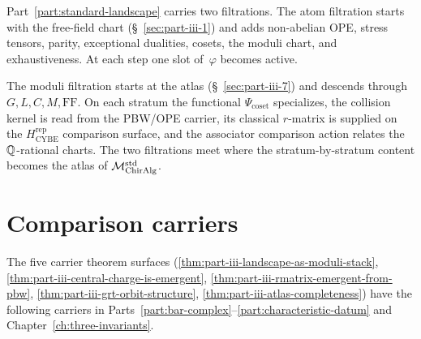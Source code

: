 Part~\ref{part:standard-landscape} carries two filtrations.
The atom filtration starts with the free-field chart
(\S~\ref{sec:part-iii-1}) and adds non-abelian OPE, stress tensors,
parity, exceptional dualities, cosets, the moduli chart, and
exhaustiveness. At each step one slot of~$\varphi$ becomes active.

The moduli filtration starts at the atlas
(\S~\ref{sec:part-iii-7}) and descends through
$G,L,C,M,\mathrm{FF}$. On each stratum the functional
$\Psi_{\mathrm{coset}}$ specializes, the collision kernel is read from
the PBW/OPE carrier, its classical $r$-matrix is supplied on the
$H_{\mathrm{CYBE}}^{\mathrm{rep}}$ comparison surface, and the
associator comparison action relates the
$\mathbb{Q}$-rational charts. The two filtrations meet where the
stratum-by-stratum content becomes the atlas of
$\mathcal{M}_{\mathrm{ChirAlg}}^{\mathrm{std}}$.

\section{Comparison carriers}
\label{sec:part-iii-dependency-map}

The five carrier theorem surfaces
(\ref{thm:part-iii-landscape-as-moduli-stack},
\ref{thm:part-iii-central-charge-is-emergent},
\ref{thm:part-iii-rmatrix-emergent-from-pbw},
\ref{thm:part-iii-grt-orbit-structure},
\ref{thm:part-iii-atlas-completeness}) have the following carriers in
Parts~\ref{part:bar-complex}--\ref{part:characteristic-datum} and
Chapter~\ref{ch:three-invariants}.

